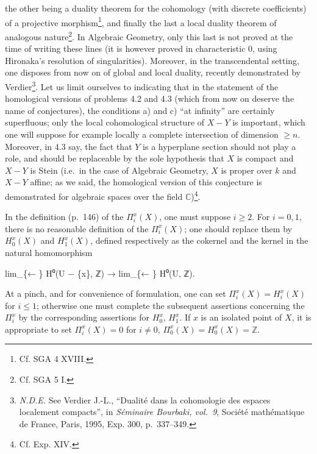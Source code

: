 \documentclass[
  11pt,
  a4paper,
]{book}
\newenvironment{Shaded}{}{}
\newcommand{\NormalTok}[1]{#1}
\begin{document}
the other being a duality theorem for the cohomology (with discrete
coefficients) of a projective morphism\footnote{Cf. SGA 4 XVIII.}, and
finally the last a local duality theorem of analogous nature\footnote{Cf.
  SGA 5 I.}. In Algebraic Geometry, only this last is not proved at the
time of writing these lines (it is however proved in characteristic 0,
using Hironaka's resolution of singularities). Moreover, in the
transcendental setting, one disposes from now on of global and local
duality, recently demonstrated by Verdier\footnote{\emph{N.D.E.} See
  Verdier J.-L., ``Dualité dans la cohomologie des espaces localement
  compacts'', in \emph{Séminaire Bourbaki, vol.~9}, Société mathématique
  de France, Paris, 1995, Exp. 300, p.~337--349.}. Let us limit
ourselves to indicating that in the statement of the homological
versions of problems 4.2 and 4.3 (which from now on deserve the name of
conjectures), the conditions a) and c) ``at infinity'' are certainly
superfluous; only the local cohomological structure of \(X - Y\) is
important, which one will suppose for example locally a complete
intersection of dimension \(\geqslant n\). Moreover, in 4.3 say, the
fact that \(Y\) is a hyperplane section should not play a role, and
should be replaceable by the sole hypothesis that \(X\) is compact and
\(X - Y\) is Stein (i.e.~in the case of Algebraic Geometry, \(X\) is
proper over \(k\) and \(X - Y\) affine; as we said, the homological
version of this conjecture is demonstrated for algebraic spaces over the
field \(\mathbb{C}\))\footnote{Cf. Exp. XIV.}.

In the definition (p.~146) of the \(\Pi^{x}_{i}(X)\), one must suppose
\(i \geqslant 2\). For \(i = 0, 1\), there is no reasonable definition
of the \(\Pi^{x}_{i}(X)\); one should replace them by \(H^{x}_{0}(X)\)
and \(H^{x}_{1}(X)\), defined respectively as the cokernel and the
kernel in the natural homomorphism

\begin{Shaded}
\begin{Highlighting}[]
\NormalTok{lim\_\{← \} H⁰(U − \{x\}, ℤ) → lim\_\{← \} H⁰(U, ℤ).}
\end{Highlighting}
\end{Shaded}

At a pinch, and for convenience of formulation, one can set
\(\Pi^{x}_{i}(X) = H^{x}_{i}(X)\) for \(i \leqslant 1\); otherwise one
must complete the subsequent assertions concerning the \(\Pi^{x}_{i}\)
by the corresponding assertions for \(H^{x}_{0}\), \(H^{x}_{1}\). If
\(x\) is an isolated point of \(X\), it is appropriate to set
\(\Pi^{x}_{i}(X) = 0\) for \(i \neq
0\), \(\Pi^{x}_{0}(X) = H^{x}_{0}(X) = \mathbb{Z}\).
\end{document}

